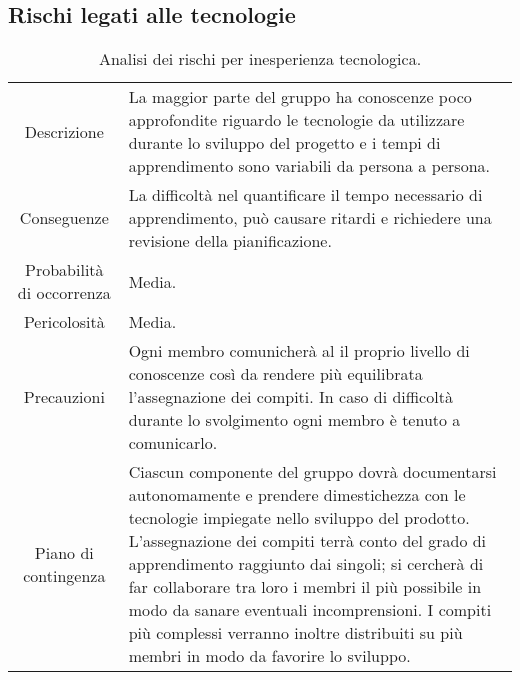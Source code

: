 \subsection{Rischi legati alle tecnologie}
\begin{table} [H]
	\begin{tabular}{|c | p{10cm}|}
	\rowcolor{darkblue} \hline
	\multicolumn{2}{|c|}{\textcolor{white}{\textbf{RT1 - Inesperienza tecnologica}}}\\ \hline
	 Descrizione & La maggior parte del gruppo ha conoscenze poco approfondite riguardo le tecnologie da utilizzare durante lo sviluppo del progetto e i tempi di apprendimento sono variabili da persona a persona.\\ \hline
	 Conseguenze & La difficoltà nel quantificare il tempo necessario di apprendimento, può causare ritardi e richiedere una revisione della pianificazione.\\ \hline
	 Probabilità di occorrenza & Media.\\ \hline
	 Pericolosità & Media.\\ \hline
	 Precauzioni & Ogni membro comunicherà al {\Responsabile} il proprio livello di conoscenze così da rendere più equilibrata l'assegnazione dei compiti. In caso di difficoltà durante lo svolgimento ogni membro è tenuto a comunicarlo.\\ \hline
	 Piano di contingenza & Ciascun componente del gruppo dovrà documentarsi autonomamente e prendere dimestichezza con le tecnologie impiegate nello sviluppo del prodotto. L’assegnazione dei compiti terrà conto del grado di apprendimento raggiunto dai singoli; si cercherà di far collaborare tra loro i membri il più possibile in modo da sanare eventuali incomprensioni. I compiti più complessi verranno inoltre distribuiti su più membri in modo da favorire lo sviluppo.\\ \hline
	\end{tabular}
	\caption{\label{tab:RT1}Analisi dei rischi per inesperienza tecnologica.}
\end{table}

